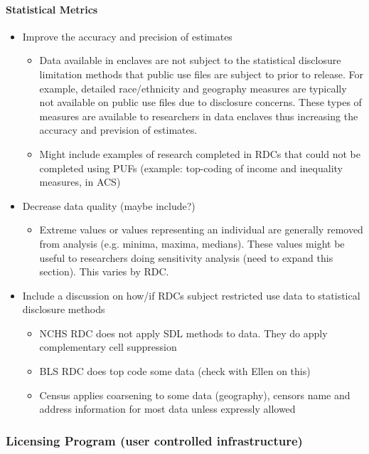 \paragraph{Statistical Metrics}
\begin{itemize}
    \item      Improve the accuracy and precision of estimates
    \begin{itemize}
          \item Data available in enclaves are not subject to the statistical disclosure limitation methods that public use files are subject to prior to release. For example, detailed race/ethnicity and geography measures are typically not available on public use files due to disclosure concerns. These types of measures are available to researchers in data enclaves thus increasing the accuracy and prevision of estimates. 
         \item Might include examples of research completed in RDCs that could not be completed using PUFs (example: top-coding of income and inequality measures, in ACS)
    \end{itemize}
    \item Decrease data quality (maybe include?)
    \begin{itemize}
         \item    Extreme values or values representing an individual are generally removed from analysis (e.g. minima, maxima, medians). These values might be useful to researchers doing sensitivity analysis (need to expand this section). This varies by RDC. 
    \end{itemize}
    \item Include a discussion on how/if RDCs subject restricted use data to statistical disclosure methods
    \begin{itemize}
            \item NCHS RDC does not apply SDL methods to data. They do apply complementary cell suppression
            \item BLS RDC does top code some data (check with Ellen on this)
            \item Census applies \gls{coarsening} to some data (geography), censors name and address information for most data unless expressly allowed
    \end{itemize}
\end{itemize}



\subsubsection{Licensing Program (user controlled infrastructure)}

